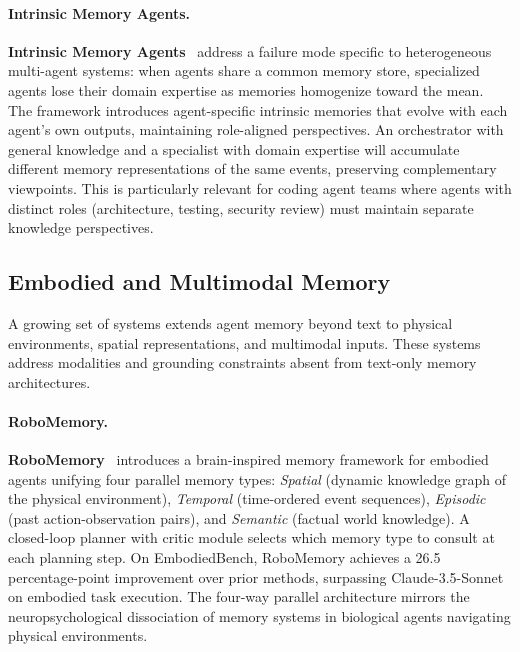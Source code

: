 \paragraph{Intrinsic Memory Agents.}
\textbf{Intrinsic Memory Agents}~\cite{intrinsicmem2025} address a
failure mode specific to heterogeneous multi-agent systems: when agents
share a common memory store, specialized agents lose their domain
expertise as memories homogenize toward the mean.  The framework
introduces agent-specific intrinsic memories that evolve with each
agent's own outputs, maintaining role-aligned perspectives.  An
orchestrator with general knowledge and a specialist with domain
expertise will accumulate different memory representations of the same
events, preserving complementary viewpoints.  This is particularly
relevant for coding agent teams where agents with distinct roles
(architecture, testing, security review) must maintain separate
knowledge perspectives.

\subsection{Embodied and Multimodal Memory}
\label{sec:embodied-memory}

A growing set of systems extends agent memory beyond text to physical
environments, spatial representations, and multimodal inputs.  These
systems address modalities and grounding constraints absent from
text-only memory architectures.

\paragraph{RoboMemory.}
\textbf{RoboMemory}~\cite{robomemory2025} introduces a brain-inspired
memory framework for embodied agents unifying four parallel memory
types: \emph{Spatial} (dynamic knowledge graph of the physical
environment), \emph{Temporal} (time-ordered event sequences),
\emph{Episodic} (past action-observation pairs), and \emph{Semantic}
(factual world knowledge).  A closed-loop planner with critic module
selects which memory type to consult at each planning step.
On EmbodiedBench, RoboMemory achieves a 26.5 percentage-point
improvement over prior methods, surpassing Claude-3.5-Sonnet on
embodied task execution.  The four-way parallel architecture mirrors
the neuropsychological dissociation of memory systems in biological
agents navigating physical environments.

